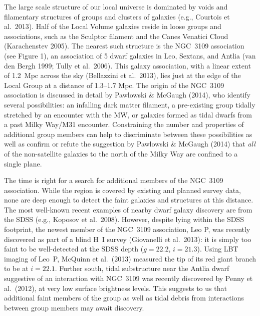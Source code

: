 The large scale structure of our local universe is dominated by voids and filamentary structures of groups and clusters of galaxies 
(e.g., Courtois et al.\ 2013).  Half of the Local Volume galaxies reside in loose groups and associations, such as the Sculptor filament 
and the Canes Venatici Cloud (Karachenstev 2005). The nearest such structure is the NGC~3109 association (see Figure 1), an
 association of 5 dwarf galaxies in Leo, Sextans, and Antlia (van den Bergh 1999; Tully et al.\ 2006). This galaxy association, 
 with a linear extent of 1.2~Mpc across the sky (Bellazzini et al.\ 2013), lies just at the edge of the Local Group at a distance of 
 1.3--1.7 Mpc. The origin of the NGC~3109 association is discussed in detail by Pawlowski \& McGaugh (2014), who identify 
 several possibilities: an infalling dark matter filament, a  pre-existing group tidally stretched by an encounter with the MW, or galaxies
 formed as tidal dwarfs from a past Milky Way/M31 encounter. Constraining the number and properties  of additional group
 members can help to discriminate between these possibilities as well as confirm or refute the suggestion by Pawlowski \& McGaugh (2014)
 that {\em all} of the non-satellite galaxies to the north of the Milky Way are confined to a single plane.

The time is right for a search for additional members of the NGC~3109 association. While the region is covered by existing  and planned
survey data, none are deep enough to detect the faint galaxies and  structures at this distance. The most
well-known recent examples of nearby dwarf galaxy discovery are from the SDSS (e.g., Koposov et al.\ 2008).
However, despite lying within the SDSS footprint, the newest member of the NGC~3109 association, Leo P, 
was recently discovered as part of a blind H~I survey (Giovanelli et al.\ 2013): it is simply too faint to
be well-detected at the SDSS  depth ($g=22.2$, $i=21.3$).
Using LBT imaging of Leo~P, McQuinn et al.\ (2013) measured the tip of its red giant branch to be at $i=22.1$.
Further south, tidal substructure near the Antlia dwarf suggestive of an interaction with NGC~3109 was recently discovered by Penny et al.\ (2012),
at very low surface brightness levels.
This suggests to us that additional  faint members of the group as well as tidal debris from interactions between group members 
may await discovery.

